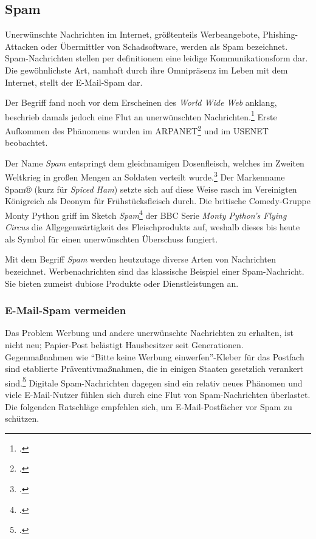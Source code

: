 \subsection{Spam} %
\label{sub:spam}
Unerwünschte Nachrichten im Internet, größtenteils Werbeangebote,
Phishing-Attacken oder Übermittler von Schadsoftware, werden als Spam
bezeichnet. Spam-Nachrichten stellen per definitionem eine leidige
Kommunikationsform dar. Die gewöhnlichste Art, namhaft durch ihre Omnipräsenz
im Leben mit dem Internet, stellt der E-Mail-Spam dar.

Der Begriff fand noch vor dem Erscheinen des \emph{World Wide Web} anklang,
beschrieb damals jedoch eine Flut an unerwünschten
Nachrichten.\footcite{originTermSpam} Erste Aufkommen des Phänomens wurden im
ARPANET\footcite{rfc:706} und im USENET beobachtet.

Der Name \emph{Spam} entspringt dem gleichnamigen Dosenfleisch, welches im
Zweiten Weltkrieg in großen Mengen an Soldaten verteilt
wurde.\footcite{lifeDuringSecondWW} Der Markenname Spam® (kurz für \emph{Spiced
Ham}) setzte sich auf diese Weise rasch im Vereinigten Königreich als Deonym
für Frühstücksfleisch durch. Die britische Comedy-Gruppe Monty Python griff im
Sketch \emph{Spam}\footcite{spamMontyPython} der BBC Serie \emph{Monty Python’s
Flying Circus} die Allgegenwärtigkeit des Fleischprodukts auf, weshalb dieses
bis heute als Symbol für einen unerwünschten Überschuss fungiert.

Mit dem Begriff \emph{Spam} werden heutzutage diverse Arten von Nachrichten
bezeichnet. Werbenachrichten sind das klassische Beispiel einer Spam-Nachricht.
Sie bieten zumeist dubiose Produkte oder Dienstleistungen an.

\subsubsection{E-Mail-Spam vermeiden}
\label{ssub:e-mail-spam-vermeiden}

Das Problem Werbung und andere unerwünschte Nachrichten zu erhalten, ist nicht
neu; Papier-Post belästigt Hausbesitzer seit Generationen. Gegenmaßnahmen wie
\enquote{Bitte keine Werbung einwerfen}-Kleber für das Postfach sind etablierte
Präventivmaßnahmen, die in einigen Staaten gesetzlich verankert
sind.\footcite{someReklameIllegal} Digitale Spam-Nachrichten dagegen sind ein
relativ neues Phänomen und viele E-Mail-Nutzer fühlen sich durch eine Flut von
Spam-Nachrichten überlastet. Die folgenden Ratschläge empfehlen sich, um
E-Mail-Postfächer vor Spam zu schützen.

